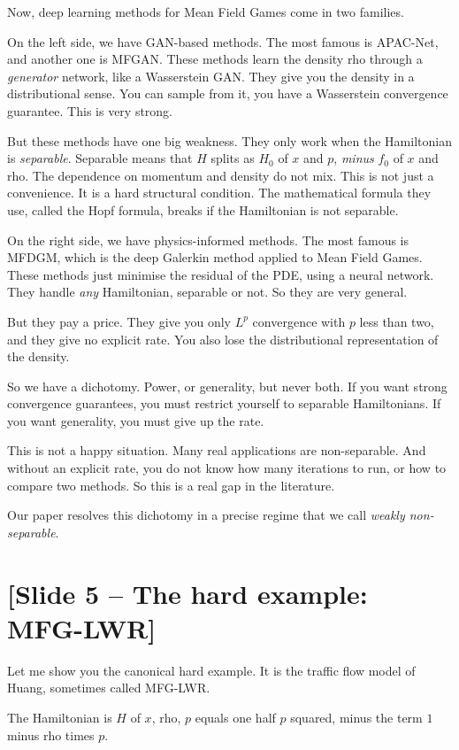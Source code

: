 \documentclass[11pt]{article}
\begin{document}
Now, deep learning methods for Mean Field Games come in two families.

On the left side, we have GAN-based methods. The most famous is APAC-Net,
and another one is MFGAN. These methods learn the density rho through a
\emph{generator} network, like a Wasserstein GAN. They give you the density
in a distributional sense. You can sample from it, you have a Wasserstein
convergence guarantee. This is very strong.

But these methods have one big weakness. They only work when the Hamiltonian
is \emph{separable}. Separable means that $H$ splits as $H_0$ of $x$ and $p$,
\emph{minus} $f_0$ of $x$ and rho. The dependence on momentum and density
do not mix. This is not just a convenience. It is a hard structural condition.
The mathematical formula they use, called the Hopf formula, breaks if the
Hamiltonian is not separable.

On the right side, we have physics-informed methods. The most famous is MFDGM,
which is the deep Galerkin method applied to Mean Field Games. These methods
just minimise the residual of the PDE, using a neural network. They handle
\emph{any} Hamiltonian, separable or not. So they are very general.

But they pay a price. They give you only $L^p$ convergence with $p$ less than
two, and they give no explicit rate. You also lose the distributional
representation of the density.

So we have a dichotomy. Power, or generality, but never both. If you want
strong convergence guarantees, you must restrict yourself to separable
Hamiltonians. If you want generality, you must give up the rate.

This is not a happy situation. Many real applications are non-separable.
And without an explicit rate, you do not know how many iterations to run,
or how to compare two methods. So this is a real gap in the literature.

Our paper resolves this dichotomy in a precise regime that we call
\emph{weakly non-separable}.

\section*{[Slide 5 -- The hard example: MFG-LWR]}

Let me show you the canonical hard example. It is the traffic flow model
of Huang, sometimes called MFG-LWR.

The Hamiltonian is $H$ of $x$, rho, $p$ equals one half $p$ squared, minus
the term $1$ minus rho times $p$.
\end{document}
